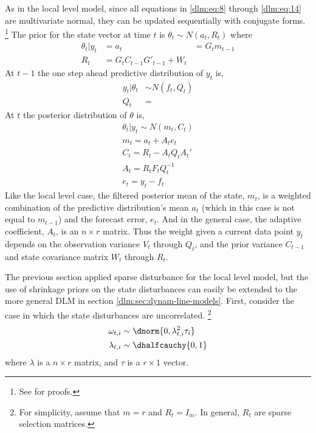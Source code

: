As in the local level model, since all equations in \eqref{dlm:eq:8} through \eqref{dlm:eq:14} are multivariate normal, they can be updated sequentially with conjugate forms.%
\footnote{See \textcite[Section 4.3][]{WestHarrison1997} for proofs.}
The prior for the state vector at time $t$ is $\theta_{t} \sim N(a_{t}, R_{t})$ where
\begin{align}
  \label{dlm:eq:29}
  \theta_{t} | y_{t} &= 
  a_{t} &= G_{t} m_{t-1} \\
  R_{t} &= G_{t} C_{t-1} G'_{t-1} + W_{t}
\end{align}
At $t-1$ the one step ahead predictive distribution of $y_{t}$ is,
\begin{align}
  \label{dlm:eq:28}
  y_{t} | \theta_{t} & \sim N(f_{t}, Q_{t}) \\
  Q_{t} &= 
\end{align}
At $t$ the posterior distribution of $\theta$ is,
\begin{align}
  \label{dlm:eq:15}
  \theta_{t} | y_{t} \sim N(m_{t}, C_{t}) \\
  m_{t} = a_{t} + A_{t} e_{t} \\
  C_{t} = R_{t} - A_{t} Q_{t} A_{t}' \\
  A_{t} = R_{t} F_{t} Q^{-1}_{t} \\
  e_{t} = y_{t} - f_{t}
\end{align}
Like the local level case, the filtered posterior mean of the state,
$m_{t}$, is a weighted combination of the predictive distribution's
mean $a_{t}$ (which in this case is not equal to $m_{t-1}$) and the
forecast error, $e_{t}$.
And in the general case, the adaptive coefficient, $A_{t}$, is an $n
\times r$  matrix.
Thus the weight given a current data point $y_{t}$ depends on the
observation variance $V_{t}$ through $Q_{t}$, and the prior variance
$C_{t-1}$ and state covariance matrix $W_{t}$ through $R_{t}$.


The previous section applied sparse disturbance for the local level model, but the use of shrinkage priors on the state disturbances can easily be extended to the more general DLM in section \ref{dlm:sec:dynam-line-models}.
First, consider the case in which the state disturbances are uncorrelated.
\footnote{
  For simplicity, assume that $m = r$ and $R_{t} = I_{m}$.
  In general, $R_{t}$ are sparse selection matrices.
}
\begin{equation}
  \label{dlm:eq:20}
  \begin{aligned}[t]
    \omega_{t,i} &\sim \dnorm{0, \lambda_{t,i}^{2} \tau_{i}} \\
    \lambda_{t,i} & \sim \dhalfcauchy{0, 1}
  \end{aligned}
\end{equation}
where $\lambda$ is a $n \times r$ matrix, and $\tau$ is a $r \times 1$ vector.

